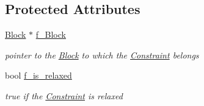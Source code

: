 \subsection*{Protected Attributes}
\begin{DoxyCompactItemize}
\item 
\mbox{\label{class_s_m_spp__di__unipi__it_1_1_constraint_a372d458e214710b23cf375b9a6edc5fc}} 
\mbox{\hyperlink{class_s_m_spp__di__unipi__it_1_1_block}{Block}} $\ast$ \mbox{\hyperlink{class_s_m_spp__di__unipi__it_1_1_constraint_a372d458e214710b23cf375b9a6edc5fc}{f\+\_\+\+Block}}
\begin{DoxyCompactList}\small\item\em pointer to the \mbox{\hyperlink{class_s_m_spp__di__unipi__it_1_1_block}{Block}} to which the \mbox{\hyperlink{class_s_m_spp__di__unipi__it_1_1_constraint}{Constraint}} belongs \end{DoxyCompactList}\item 
\mbox{\label{class_s_m_spp__di__unipi__it_1_1_constraint_a3120b6af44b090970678e5628682d773}} 
bool \mbox{\hyperlink{class_s_m_spp__di__unipi__it_1_1_constraint_a3120b6af44b090970678e5628682d773}{f\+\_\+is\+\_\+relaxed}}
\begin{DoxyCompactList}\small\item\em true if the \mbox{\hyperlink{class_s_m_spp__di__unipi__it_1_1_constraint}{Constraint}} is relaxed \end{DoxyCompactList}\end{DoxyCompactItemize}
